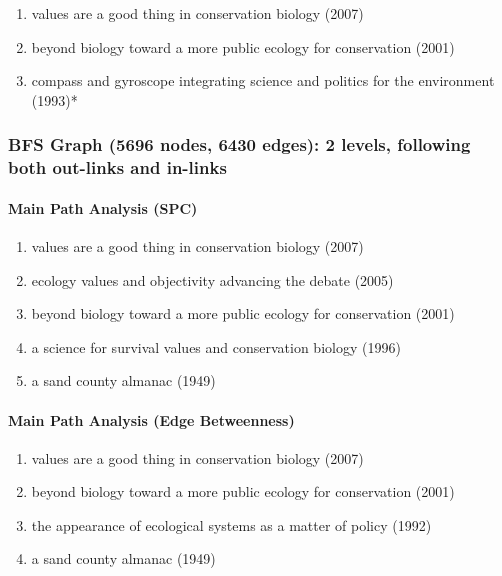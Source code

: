 \documentclass[lettepaper,]{article}
\providecommand{\tightlist}{%
  \setlength{\itemsep}{0pt}\setlength{\parskip}{0pt}}
\let\oldparagraph\paragraph
\renewcommand{\paragraph}[1]{\oldparagraph{#1}\mbox{}}
\begin{document}
\begin{enumerate}
\def\labelenumi{\arabic{enumi}.}
\tightlist
\item
  values are a good thing in conservation biology (2007)
\item
  beyond biology toward a more public ecology for conservation (2001)
\item
  compass and gyroscope integrating science and politics for the
  environment (1993)*
\end{enumerate}

\hypertarget{bfs-graph-5696-nodes-6430-edges-2-levels-following-both-out-links-and-in-links}{%
\subsubsection{BFS Graph (5696 nodes, 6430 edges): 2 levels, following
both out-links and
in-links}\label{bfs-graph-5696-nodes-6430-edges-2-levels-following-both-out-links-and-in-links}}

\hypertarget{main-path-analysis-spc-5}{%
\paragraph{Main Path Analysis (SPC)}\label{main-path-analysis-spc-5}}

\begin{enumerate}
\def\labelenumi{\arabic{enumi}.}
\tightlist
\item
  values are a good thing in conservation biology (2007)
\item
  ecology values and objectivity advancing the debate (2005)
\item
  beyond biology toward a more public ecology for conservation (2001)
\item
  a science for survival values and conservation biology (1996)
\item
  a sand county almanac (1949)
\end{enumerate}

\hypertarget{main-path-analysis-edge-betweenness-5}{%
\paragraph{Main Path Analysis (Edge
Betweenness)}\label{main-path-analysis-edge-betweenness-5}}

\begin{enumerate}
\def\labelenumi{\arabic{enumi}.}
\tightlist
\item
  values are a good thing in conservation biology (2007)
\item
  beyond biology toward a more public ecology for conservation (2001)
\item
  the appearance of ecological systems as a matter of policy (1992)
\item
  a sand county almanac (1949)
\end{enumerate}
\end{document}
